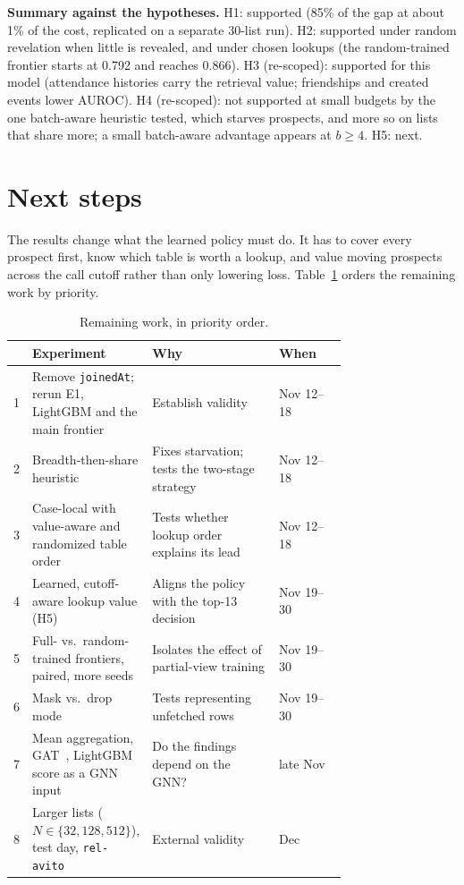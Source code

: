 \documentclass{article}
\begin{document}
\textbf{Summary against the hypotheses.} H1: supported (85\% of the gap at about 1\% of the cost, replicated on a separate 30-list run). H2: supported under random revelation when little is revealed, and under chosen lookups (the random-trained frontier starts at 0.792 and reaches 0.866). H3 (re-scoped): supported for this model (attendance histories carry the retrieval value; friendships and created events lower AUROC). H4 (re-scoped): not supported at small budgets by the one batch-aware heuristic tested, which starves prospects, and more so on lists that share more; a small batch-aware advantage appears at $b \geq 4$. H5: next.

\section{Next steps}
\label{sec:next}
The results change what the learned policy must do. It has to cover every prospect first, know which table is worth a lookup, and value moving prospects across the call cutoff rather than only lowering loss. Table~\ref{tab:next} orders the remaining work by priority.

\begin{table}[h]
  \centering
  \small
  \begin{tabular}{@{}rp{0.36\linewidth}p{0.38\linewidth}l@{}}
    \toprule
    & Experiment & Why & When \\
    \midrule
    1 & Remove \texttt{joinedAt}; rerun E1, LightGBM and the main frontier & Establish validity & Nov 12--18 \\
    2 & Breadth-then-share heuristic & Fixes starvation; tests the two-stage strategy & Nov 12--18 \\
    3 & Case-local with value-aware and randomized table order & Tests whether lookup order explains its lead & Nov 12--18 \\
    4 & Learned, cutoff-aware lookup value (H5) & Aligns the policy with the top-13 decision & Nov 19--30 \\
    5 & Full- vs.\ random-trained frontiers, paired, more seeds & Isolates the effect of partial-view training & Nov 19--30 \\
    6 & Mask vs.\ drop mode & Tests representing unfetched rows & Nov 19--30 \\
    7 & Mean aggregation, GAT~\cite{velickovic2018gat}, LightGBM score as a GNN input & Do the findings depend on the GNN? & late Nov \\
    8 & Larger lists ($N \in \{32, 128, 512\}$), test day, \texttt{rel-avito} & External validity & Dec \\
    \bottomrule
  \end{tabular}
  \caption{Remaining work, in priority order.}
  \label{tab:next}
\end{table}
\end{document}
